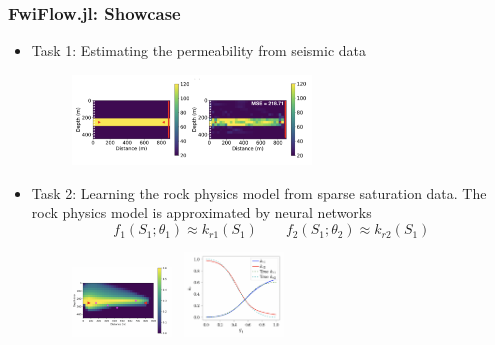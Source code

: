 \documentclass{beamer}
\begin{document}
\begin{frame}
	\frametitle{FwiFlow.jl: Showcase}
	\begin{itemize}
		\item Task 1: Estimating the permeability from seismic data 
		\begin{figure}[hbt]
		\centering
  \includegraphics[width=0.6\textwidth]{../coupled}
\end{figure}
\item Task 2: Learning the rock physics model from sparse saturation data. The rock physics model is approximated by neural networks  
{\scriptsize$$f_1(S_1; \theta_1) \approx k_{r1}(S_1)\qquad f_2(S_1; \theta_2) \approx k_{r2}(S_1)$$}
\begin{figure}
	\centering
	\includegraphics[width=0.25\textwidth]{../sat}~
  \includegraphics[width=0.25\textwidth]{../rock}
\end{figure}
	\end{itemize}
\end{frame}
\end{document}
